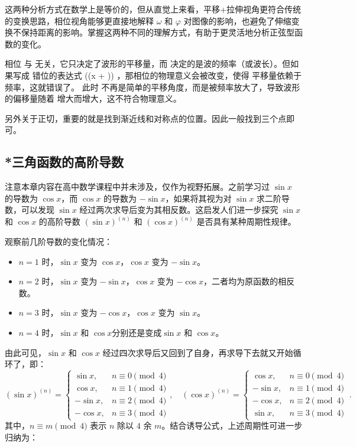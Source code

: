 这两种分析方式在数学上是等价的，但从直觉上来看，平移+拉伸视角更符合传统的变换思路，相位视角能够更直接地解释 $\omega$ 和 $\varphi$ 对图像的影响，也避免了伸缩变换不保持距离的影响。掌握这两种不同的理解方式，有助于更灵活地分析正弦型函数的变化。

相位  \phi  与  \omega  无关，它只决定了波形的平移量，而  \omega  决定的是波的频率（或波长）。但如果写成 错位的表达式  \sin(\omega(x + \phi)) ，那相位的物理意义会被改变，使得 平移量依赖于频率，这就错误了。
此时  \phi  不再是简单的平移角度，而是被频率放大了，导致波形的偏移量随着  \omega  增大而增大，这不符合物理意义。

另外关于正切，重要的就是找到渐近线和对称点的位置。因此一般找到三个点即可。

\subsection{*三角函数的高阶导数}


注意本章内容在高中数学课程中并未涉及，仅作为视野拓展。之前学习过 $\sin x$ 的导数为 $\cos x$，而 $\cos x$ 的导数为 $-\sin x$，如果将其视为对 $\sin x$ 求二阶导数，可以发现 $\sin x$ 经过两次求导后变为其相反数。这启发人们进一步探究 $\sin x$ 和 $\cos x$ 的高阶导数 $(\sin x)^{(n)}$ 和 $(\cos x)^{(n)}$ 是否具有某种周期性规律。

观察前几阶导数的变化情况：
\begin{itemize}
\item $n = 1$ 时，$\sin x$ 变为 $\cos x$，$\cos x$ 变为 $-\sin x$。
\item $n = 2$ 时，$\sin x$ 变为 $-\sin x$，$\cos x$ 变为 $-\cos x$，二者均为原函数的相反数。
\item $n = 3$ 时，$\sin x$ 变为 $-\cos x$，$\cos x$ 变为 $\sin x$。
\item $n = 4$ 时，$\sin x$ 和 $\cos x$分别还是变成$\sin x$ 和 $\cos x$。
\end{itemize}
由此可见，$\sin x$ 和 $\cos x$ 经过四次求导后又回到了自身，再求导下去就又开始循环了，即：
\begin{equation}\label{eq_HsSinF_2}
(\sin x)^{(n)}  =
\begin{cases}
\sin x, & n \equiv 0 \pmod{4} \\
\cos x, & n \equiv 1 \pmod{4} \\
-\sin x, & n \equiv 2 \pmod{4} \\
-\cos x, & n \equiv 3 \pmod{4}
\end{cases},\quad(\cos x)^{(n)} =
\begin{cases}
\cos x, & n \equiv 0 \pmod{4} \\
-\sin x, & n \equiv 1 \pmod{4} \\
-\cos x, & n \equiv 2 \pmod{4} \\
\sin x, & n \equiv 3 \pmod{4}
\end{cases}~.
\end{equation}
其中，$n \equiv m \pmod{4}$ 表示 $n$ 除以 $4$ 余 $m$。结合诱导公式，上述周期性可进一步归纳为：

